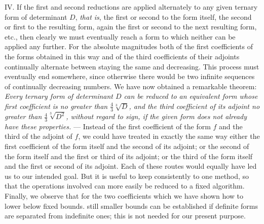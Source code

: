 \enlargethispage{-2\baselineskip}IV. If the first and second reductions are applied alternately to any given ternary form of determinant \(D\), \emph{that is}, the first or second to the form itself, the second or first to the resulting form, again the first or second to the next resulting form, etc., then clearly we must eventually reach a form to which neither can be applied any further. For the absolute magnitudes both of the first coefficients of the forms obtained in this way and of the third coefficients of their adjoints continually alternate between staying the same and decreasing. This process must eventually end somewhere, since otherwise there would be two infinite sequences of continually decreasing numbers. We have now obtained a remarkable theorem: \emph{Every ternary form of determinant \(D\) can be reduced to an equivalent form whose first coefficient is no greater than \(\frac{4}{3}\sqrt[3]{D}\), and the third coefficient of its adjoint no greater than \(\frac{4}{3}\sqrt[3]{D^2}\), without regard to sign, if the given form does not already have these properties.} --- Instead of the first coefficient of the form \(f\) and the third of the adjoint of \(f\), we could have treated in exactly the same way either the first coefficient of the form itself and the second of its adjoint; or the second of the form itself and the first or third of its adjoint; or the third of the form itself and the first or second of its adjoint. Each of these routes would equally have led us to our intended goal. But it is useful to keep consistently to one method, so that the operations involved can more easily be reduced to a fixed algorithm. Finally, we observe that for the two coefficients which we have shown how to lower below fixed bounds. still smaller bounds can be established if definite forms are separated from indefinite ones; this is not needed for our present purpose.
